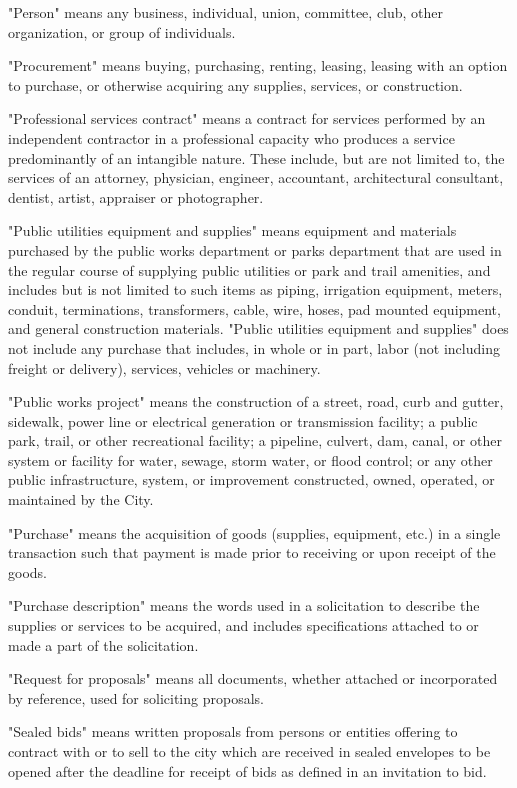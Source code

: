 \noindent
"Person" means any business, individual, union, committee, club, other organization, or group of individuals. 

\noindent
"Procurement" means buying, purchasing, renting, leasing, leasing with an option to purchase, or otherwise acquiring any supplies, services, or construction. 

\noindent
"Professional services contract" means a contract for services performed by an independent contractor in a professional capacity who produces a service predominantly of an intangible nature. These include, but are not limited to, the services of an attorney, physician, engineer, accountant, architectural consultant, dentist, artist, appraiser or photographer. 

\noindent
"Public utilities equipment and supplies" means equipment and materials purchased by the public works department or parks department that are used in the regular course of supplying public utilities or park and trail amenities, and includes but is not limited to such items as piping, irrigation equipment, meters, conduit, terminations, transformers, cable, wire, hoses, pad mounted equipment, and general construction materials. "Public utilities equipment and supplies" does not include any purchase that includes, in whole or in part, labor (not including freight or delivery), services, vehicles or machinery. 

\noindent
"Public works project" means the construction of a street, road, curb and gutter, sidewalk, power line or electrical generation or transmission facility; a public park, trail, or other recreational facility; a pipeline, culvert, dam, canal, or other system or facility for water, sewage, storm water, or flood control; or any other public infrastructure, system, or improvement constructed, owned, operated, or maintained by the City. 

\noindent
"Purchase" means the acquisition of goods (supplies, equipment, etc.) in a single transaction such that payment is made prior to receiving or upon receipt of the goods. 

\noindent
"Purchase description" means the words used in a solicitation to describe the supplies or services to be acquired, and includes specifications attached to or made a part of the solicitation. 

\noindent
"Request for proposals" means all documents, whether attached or incorporated by reference, used for soliciting proposals. 

\noindent
"Sealed bids" means written proposals from persons or entities offering to contract with or to sell to the city which are received in sealed envelopes to be opened after the deadline for receipt of bids as defined in an invitation to bid. 

